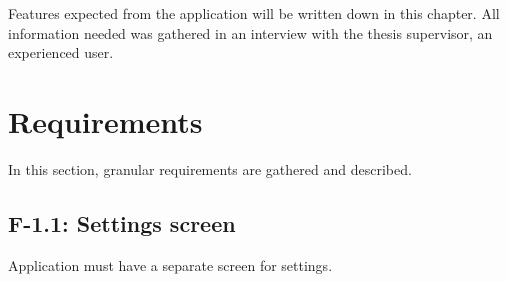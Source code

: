 Features expected from the application will be written down in this chapter.
All information needed was gathered in an interview with the thesis supervisor, an experienced \etl{} user.
\section{Requirements}
In this section, granular requirements are gathered and described.


\subsection*{F-1.1: Settings screen}
Application must have a separate screen for settings.
